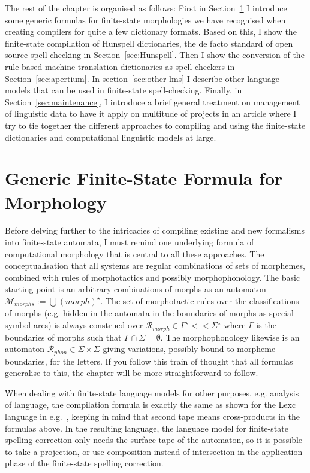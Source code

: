 \documentclass[officiallayout]{unihelcompling}
\begin{document}
The rest of the chapter is organised as follows: First in
Section~\ref{sec:generic} I introduce some generic formulas for finite-state
morphologies we have recognised when creating compilers for quite a few
dictionary formats. Based on this, I show the finite-state compilation of
Hunspell dictionaries, the de facto standard of open source spell-checking in
Section~\ref{sec:Hunspell}.  Then I show the conversion of the rule-based
machine translation dictionaries as spell-checkers in
Section~\ref{sec:apertium}. In section~\ref{sec:other-lms} I describe other
language models that can be used in finite-state spell-checking. Finally, in
Section~\ref{sec:maintenance}, I introduce a brief general treatment on
management of linguistic data to have it apply on multitude of projects in an
article where I try to tie together the different approaches to compiling and
using the finite-state dictionaries and computational linguistic models at
large.

\section{Generic Finite-State Formula for Morphology}
\label{sec:generic}

Before delving further to the intricacies of compiling existing and new
formalisms into finite-state automata, I must remind one underlying formula of
computational morphology that is central to all these approaches. The
conceptualisation that all systems are regular combinations of sets of
morphemes, combined with rules of morphotactics and possibly morphophonology.
The basic starting point is an arbitrary combinations of morphs as an automaton
$\mathcal{M}_{morphs} := \bigcup ({morph})^\star$. The set of morphotactic
rules over the classifications of morphs (e.g. hidden in the automata in the
boundaries of morphs as special symbol arcs) is always construed over
$\mathcal{R}_{morph} \in \Gamma^\star << \Sigma^\star$ where $\Gamma$ is the
boundaries of morphs such that $\Gamma \cap \Sigma = \emptyset$. The
morphophonology likewise is an automaton $\mathcal{R}_{phon} \in \Sigma \times
\Sigma$ giving variations, possibly bound to morpheme boundaries, for the
letters. If you follow this train of thought that all formulas generalise to
this, the chapter will be more straightforward to follow.

When dealing with finite-state language models for other purposes, e.g.
analysis of language, the compilation formula is exactly the same as shown for
the Lexc language in e.g.~\citet{linden2009hfst}, keeping in mind that second
tape means cross-products in the formulas above. In the resulting language, the
language model for finite-state spelling correction only needs the surface tape
of the automaton, so it is possible to take a projection, or use composition
instead of intersection in the application phase of the finite-state
spelling correction.
\end{document}
